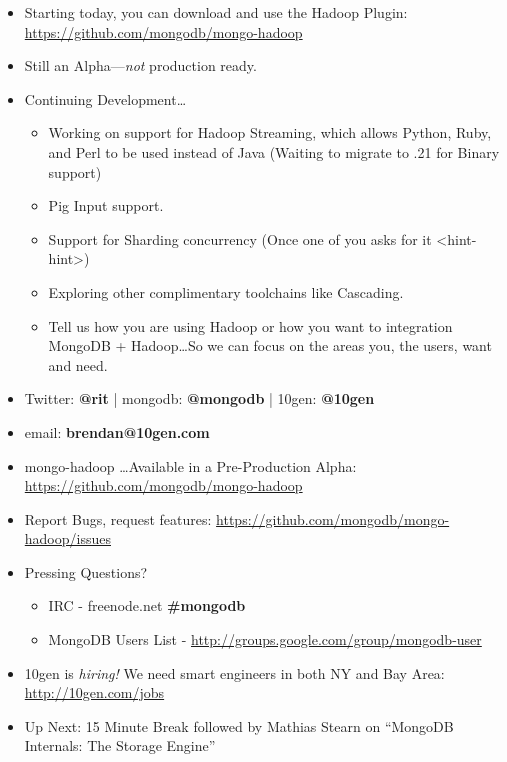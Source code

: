 \documentclass[xcolor=dvipsnames]{beamer}
\newenvironment{itemizeframe}
               {\begin{frame}\startitemizeframe} 
               {\stopitemizeframe\end{frame}}
\newcommand\startitemizeframe{\begin{itemize}} \newcommand\stopitemizeframe{\end{itemize}}
\begin{document}
\begin{itemizeframe}
    \frametitle{Mongo Hadoop Plugin}
    \item Starting today, you can download and use the Hadoop Plugin:  \url{https://github.com/mongodb/mongo-hadoop}
    \item Still an Alpha---{\em not} production ready.
    \item Continuing Development\ldots
        \begin{itemize}
            \item Working on support for Hadoop Streaming, which allows Python, Ruby, and Perl to be used instead of Java (Waiting to migrate to .21 for Binary support)
            \item Pig Input support.
            \item Support for Sharding concurrency (Once one of you asks for it <hint-hint>)
            \item Exploring other complimentary toolchains like Cascading.
            \item Tell us how you are using Hadoop or how you want to integration MongoDB + Hadoop\ldots So we can focus on the areas you, the users, want and need.
        \end{itemize}
\end{itemizeframe}
\begin{itemizeframe}
    \frametitle{Questions?}
        \item Twitter: {\bf @rit} | mongodb: {\bf @mongodb} | 10gen: {\bf @10gen }
        \item email: {\bf brendan@10gen.com}	
		\item mongo-hadoop \ldots Available in a Pre-Production Alpha: \url{https://github.com/mongodb/mongo-hadoop}
		\item Report Bugs, request features: \url{https://github.com/mongodb/mongo-hadoop/issues}
    \item Pressing Questions?
    \begin{itemize}
        \item IRC - {freenode.net \bf\#mongodb}
        \item MongoDB Users List - \url{http://groups.google.com/group/mongodb-user}
    \end{itemize}
    \item {\Large 10gen is {\em hiring!}  We need smart engineers in both NY and Bay Area: \url{http://10gen.com/jobs}}
    \item Up Next: 15 Minute Break followed by Mathias Stearn on ``MongoDB Internals: The Storage Engine''
\end{itemizeframe}
\end{document}
